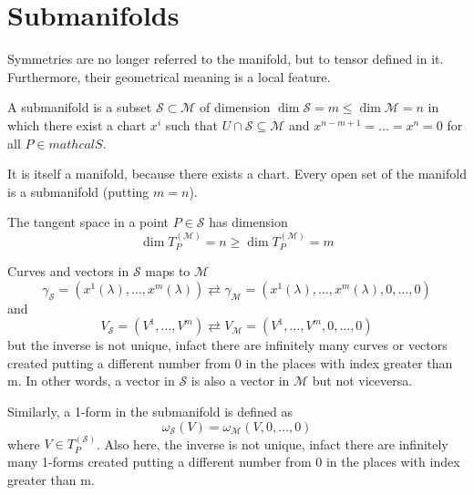 \section{Submanifolds}

    Symmetries are no longer referred to the manifold, but to tensor defined in it. Furthermore, their geometrical meaning is a local feature.

    \begin{definition}[submanifold]
        A submanifold is a subset $\mathcal S \subset \mathcal M$ of dimension $\dim \mathcal S = m \leq \dim \mathcal M = n$ in which there exist a chart $x^i$ such that $U \cap \mathcal S \subseteq \mathcal M$ and $x^{n-m+1} = \ldots = x^n = 0$ for all $P \in mathcal S$.
    \end{definition}

    It is itself a manifold, because there exists a chart. Every open set of the manifold is a submanifold (putting $m = n$). 

    The tangent space in a point $P \in \mathcal S$ has dimension
    \begin{equation*}
        \dim T_P^{(\mathcal M)} = n \geq \dim T_P^{(\mathcal M)} = m
    \end{equation*}

    Curves and vectors in $\mathcal S$ maps to $\mathcal M$
    \begin{equation*}
        \gamma_{\mathcal S} = (x^1(\lambda), \ldots, x^m(\lambda)) \rightleftarrows \gamma_{\mathcal M} = (x^1(\lambda), \ldots, x^m(\lambda), 0, \ldots, 0)
    \end{equation*}
    and
    \begin{equation*}
        V_{\mathcal S} = (V^1, \ldots, V^m) \rightleftarrows V_{\mathcal M} = (V^1, \ldots, V^m, 0, \ldots, 0)
    \end{equation*}
    but the inverse is not unique, infact there are infinitely many curves or vectors created putting a different number from $0$ in the places with index greater than m. In other words, a vector in $\mathcal S$ is also a vector in $\mathcal M$ but not viceversa. 

    Similarly, a 1-form in the submanifold is defined as 
    \begin{equation*}
        \omega_{\mathcal S} (V) = \omega_{\mathcal M} (V, 0, \ldots, 0)
    \end{equation*}
    where $V \in T_P^{(\mathcal S)}$. Also here, the inverse is not unique, infact there are infinitely many 1-forms created putting a different number from $0$ in the places with index greater than m. 

